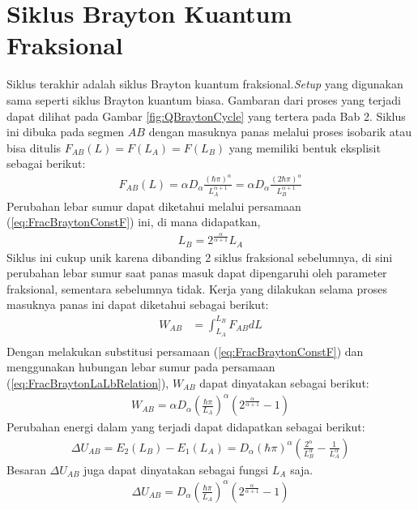 \section{Siklus Brayton Kuantum Fraksional}
Siklus terakhir adalah siklus Brayton kuantum fraksional.\textit{Setup} yang digunakan sama seperti siklus Brayton kuantum biasa. Gambaran dari proses yang terjadi dapat dilihat pada Gambar \ref{fig:QBraytonCycle} yang tertera pada Bab 2. Siklus ini dibuka pada segmen \(AB\) dengan masuknya panas melalui proses isobarik atau bisa ditulis \(F_{AB}(L) = F(L_A) = F(L_B)\) yang memiliki bentuk eksplisit sebagai berikut:
\begin{align}
    F_{AB}(L) = \alpha D_\alpha\frac{(\hbar\pi)^\alpha}{L_A^{\alpha+1}} = \alpha D_\alpha\frac{(2\hbar\pi)^\alpha}{L_B^{\alpha+1}} \label{eq:FracBraytonConstF}
\end{align}
Perubahan lebar sumur dapat diketahui melalui persamaan (\ref{eq:FracBraytonConstF}) ini, di mana didapatkan,
\begin{align}
    L_B = 2^\frac{\alpha}{\alpha+1}L_A \label{eq:FracBraytonLaLbRelation}
\end{align}
Siklus ini cukup unik karena dibanding 2 siklus fraksional sebelumnya, di sini perubahan lebar sumur saat panas masuk dapat dipengaruhi oleh parameter fraksional, sementara sebelumnya tidak. Kerja yang dilakukan selama proses masuknya panas ini dapat diketahui sebagai berikut:
\begin{align}
    W_{AB} &= \int_{L_A}^{L_B} F_{AB} dL \\
\end{align}
Dengan melakukan substitusi persamaan (\ref{eq:FracBraytonConstF}) dan menggunakan hubungan lebar sumur pada persamaan (\ref{eq:FracBraytonLaLbRelation}), \(W_{AB}\) dapat dinyatakan sebagai berikut: 
\begin{align}
    W_{AB} = \alpha D_\alpha\left(\frac{\hbar\pi}{L_A}\right)^\alpha (2^\frac{\alpha}{\alpha+1}-1)
\end{align}
Perubahan energi dalam yang terjadi dapat didapatkan sebagai berikut:
\begin{align}
    \Delta U_{AB} = E_2(L_B) - E_1(L_A) = D_\alpha(\hbar\pi)^\alpha \left(\frac{2^\alpha}{L_B^\alpha} - \frac{1}{L_A^\alpha}\right)
\end{align}
Besaran \(\Delta U_{AB}\) juga dapat dinyatakan sebagai fungsi \(L_A\) saja.
\begin{align}
    \Delta U_{AB} = D_\alpha \left(\frac{\hbar\pi}{L_A}\right)^\alpha (2^\frac{\alpha}{\alpha+1} - 1)
\end{align}
